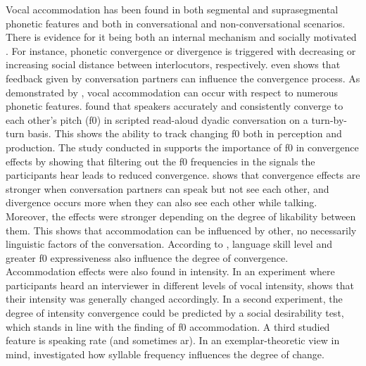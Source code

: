 Vocal accommodation has been found in both segmental \citep{Pardo2010conversational, Smith2007prosodic} and suprasegmental \citep{Walker2015repeat, Shockley2004imitation} phonetic features and
both in conversational \citep{Pardo2006phonetic, Lewandowski2012talent, Weise2018looking} and non-conversational \citep{Babel2014novelty, Shockley2004imitation} scenarios.
There is evidence for it being both an internal mechanism \citep{Pickering2004behavioral} and socially motivated \citep{Kim2011phonetic, Giles1991CAT}.
For instance, phonetic convergence \citep{Giles1973mobility} or divergence \citep{Bourhis1977distinctiveness} is triggered with decreasing or increasing social distance between interlocutors, respectively.
 even shows that feedback given by conversation partners can influence the convergence process.
As demonstrated by \citet{Pardo2013measuring}, vocal accommodation can occur with respect to numerous phonetic features.
\citet{Aubanel2020speaking} found that speakers accurately and consistently converge to each other's pitch (\ac{f0}) in scripted read-aloud dyadic conversation on a turn-by-turn basis.
This shows the ability to track changing \ac{f0} both in perception and production.
The study conducted in \citet{Babel2012role} supports the importance of \ac{f0} in convergence effects by showing that filtering out the \ac{f0} frequencies in the signals the participants hear leads to reduced convergence.
\citet{Schweitzer2017visibility} shows that convergence effects are stronger when conversation partners can speak but not see each other, and divergence occurs more when they can also see each other while talking.
Moreover, the effects were stronger depending on the degree of likability between them.
This shows that accommodation can be influenced by other, no necessarily linguistic factors of the conversation.
According to \citet{Lehnert2020relationship}, language skill level and greater \ac{f0} expressiveness also influence the degree of convergence.
Accommodation effects were also found in intensity.
In an experiment where participants heard an interviewer in different levels of vocal intensity, \citet{Natale1975convergence} shows that their intensity was generally changed accordingly.
In a second experiment, the degree of intensity convergence could be predicted by a social desirability test, which stands in line with the finding of \ac{f0} accommodation.
A third studied feature is speaking rate (and sometimes \acf{ar}).
In an exemplar-theoretic view in mind, \citet{Schweitzer2016exemplar} investigated how syllable frequency influences the degree of change.
